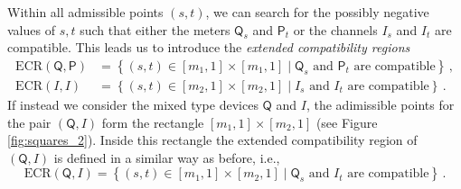 \documentclass[12pt,reqno]{amsart}
\theoremstyle{definition}
\newcommand{\Qo}{\mathsf{Q}}%
\newcommand{\Po}{\mathsf{P}}%
\newcommand{\ECR}[1]{\textrm{ECR} #1} %
\begin{document}
Within all admissible points $(s,t)$, we can search for the possibly negative values of $s,t$ such that either the meters $\Qo_s$ and $\Po_t$ or the channels $I_s$ and $I_t$ are compatible. This leads us to introduce the {\em extended compatibility regions}
\begin{align*}
\ECR{(\Qo,\Po)} & = \left\{(s,t) \in [m_1,1]\times [m_1,1] \mid \Qo_s \text{ and } \Po_t \text{ are compatible}\right\}\,,\\
\ECR{(I,I)} & = \left\{(s,t) \in [m_2,1]\times [m_2,1] \mid I_s \text{ and } I_t \text{ are compatible}\right\}\,.
\end{align*}
If instead we consider the mixed type devices $\Qo$ and $I$, the adimissible points for the pair $(\Qo,I)$ form the rectangle $[m_1,1]\times[m_2,1]$ (see Figure \ref{fig:squares_2}). Inside this rectangle the extended compatibility region of $(\Qo,I)$ is defined in a similar way as before, i.e.,
\begin{equation*}
\ECR{(\Qo,I)} = \left\{(s,t) \in [m_1,1]\times [m_2,1] \mid \Qo_s \text{ and } I_t \text{ are compatible}\right\}\,.
\end{equation*}
\end{document}
